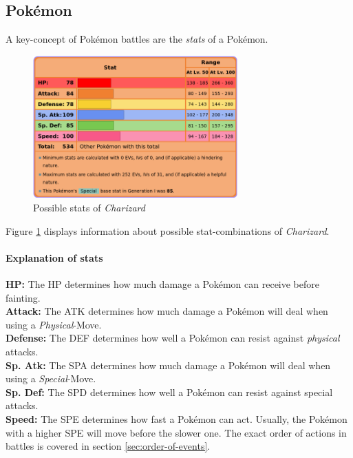 \subsection{Pokémon}
\label{sec:pokemon}
A key-concept of Pokémon battles are the \textit{stats} of a Pokémon. 
\begin{figure}[h]
	\centering
	\includegraphics[width=0.7\textwidth]{images/charizard-stats.png}
	\caption{Possible stats of \textit{Charizard} ~\autocite{Bulbapedia:Charizard}}
	\label{fig:charizard-stats}
\end{figure}
Figure \ref{fig:charizard-stats} displays information about possible stat-combinations of 
\textit{Charizard}. 
\paragraph{Explanation of stats}
\textbf{HP:} The \ac{HP} determines how much damage a Pokémon can receive before fainting. \\
\textbf{Attack:} The \ac{ATK} determines how much damage a Pokémon will deal when using 
a \textit{Physical}-Move. \\
\textbf{Defense:} The \ac{DEF} determines how well a Pokémon can resist against \textit{physical} attacks. \\
\textbf{Sp. Atk:} The \ac{SPA} determines how much damage a Pokémon will deal when using
a \textit{Special}-Move. \\
\textbf{Sp. Def:} The \ac{SPD} determines how well a Pokémon can resist against special attacks. \\
\textbf{Speed:} The \ac{SPE} determines how fast a Pokémon can act. Usually, the Pokémon with a higher
\ac{SPE} will move before the slower one. The exact order of actions in battles is covered in section
\ref{sec:order-of-events}.


